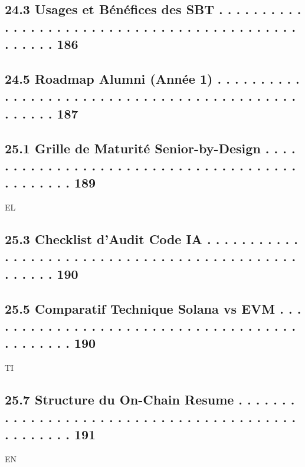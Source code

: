 \documentclass[12pt,landscape,a4paper]{article}
\begin{document}
\subsection{24.3 Usages et Bénéfices des SBT . . . . . . . . . . . . . . . . . . . . . . . . . . . . . . . . . . . . . . . . . . . . . . . . . . 186}
\subsection{24.5 Roadmap Alumni (Année 1) . . . . . . . . . . . . . . . . . . . . . . . . . . . . . . . . . . . . . . . . . . . . . . . . . . 187}
\vspace{0.5em}
\subsection{25.1 Grille de Maturité Senior-by-Design . . . . . . . . . . . . . . . . . . . . . . . . . . . . . . . . . . . . . . . . . . . . . . 189}
\vspace{0.5em}
\vspace{0.5em}
\vspace{0.5em}
\vspace{0.5em}
EL\\
\subsection{25.3 Checklist d’Audit Code IA . . . . . . . . . . . . . . . . . . . . . . . . . . . . . . . . . . . . . . . . . . . . . . . . . . . 190}
\subsection{25.5 Comparatif Technique Solana vs EVM . . . . . . . . . . . . . . . . . . . . . . . . . . . . . . . . . . . . . . . . . . . . . 190}
\vspace{0.5em}
\vspace{0.5em}
\vspace{0.5em}
\vspace{0.5em}
TI\\
\subsection{25.7 Structure du On-Chain Resume . . . . . . . . . . . . . . . . . . . . . . . . . . . . . . . . . . . . . . . . . . . . . . . . . 191}
\vspace{0.5em}
\vspace{0.5em}
\vspace{0.5em}
\vspace{0.5em}
EN\\
\end{document}

